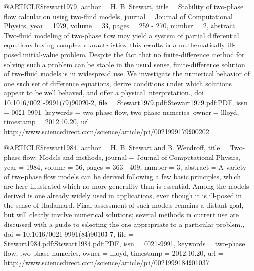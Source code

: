 {{@ARTICLE{Stewart1979,
  author = {H. B. Stewart},
  title = {Stability of two-phase flow calculation using two-fluid models},
  journal = {Journal of Computational Physics},
  year = {1979},
  volume = {33},
  pages = {259 - 270},
  number = {2},
  abstract = {Two-fluid modeling of two-phase flow may yield a system of partial
	differential equations having complex characteristics; this results
	in a mathematically ill-posed initial-value problem. Despite the
	fact that no finite-difference method for solving such a problem
	can be stable in the usual sense, finite-difference solution of two-fluid
	models is in widespread use. We investigate the numerical behavior
	of one such set of difference equations, derive conditions under
	which solutions appear to be well behaved, and offer a physical interpretation.},
  doi = {10.1016/0021-9991(79)90020-2},
  file = {Stewart1979.pdf:Stewart1979.pdf:PDF},
  issn = {0021-9991},
  keywords = {two-phase flow, two-phase numerics},
  owner = {llloyd},
  timestamp = {2012.10.20},
  url = {http://www.sciencedirect.com/science/article/pii/0021999179900202}
}

@ARTICLE{Stewart1984,
  author = {H. B. Stewart and B. Wendroff},
  title = {Two-phase flow: Models and methods},
  journal = {Journal of Computational Physics},
  year = {1984},
  volume = {56},
  pages = {363 - 409},
  number = {3},
  abstract = {A variety of two-phase flow models can be derived following a few
	basic principles, which are here illustrated which no more generality
	than is essential. Among the models derived is one already widely
	used in applications, even though it is ill-posed in the sense of
	Hadamard. Final assessment of such models remains a distant goal,
	but will clearly involve numerical solutions; several methods in
	current use are discussed with a guide to selecting the one appropriate
	to a particular problem.},
  doi = {10.1016/0021-9991(84)90103-7},
  file = {Stewart1984.pdf:Stewart1984.pdf:PDF},
  issn = {0021-9991},
  keywords = {two-phase flow, two-phase numerics},
  owner = {llloyd},
  timestamp = {2012.10.20},
  url = {http://www.sciencedirect.com/science/article/pii/0021999184901037}
}

}}
